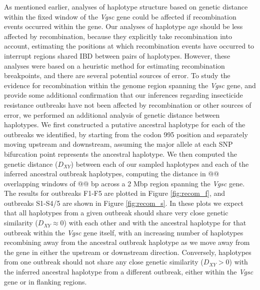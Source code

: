 \documentclass[a4paper,11pt,abstracton,hidelinks]{scrartcl}
\begin{document}
%
As mentioned earlier, analyses of haplotype structure based on genetic distance within the fixed window of the \textit{Vgsc} gene could be affected if recombination events occurred within the gene.
%
Our analyses of haplotype age should be less affected by recombination, because they explicitly take recombination into account, estimating the positions at which recombination events have occurred to interrupt regions shared IBD between pairs of haplotypes.
%
However, these analyses were based on a heuristic method for estimating recombination breakpoints, and there are several potential sources of error.
%
To study the evidence for recombination within the genome region spanning the \textit{Vgsc} gene, and provide some additional confirmation that our inferences regarding insecticide resistance outbreaks have not been affected by recombination or other sources of error, we performed an additional analysis of genetic distance between haplotypes.
%
We first constructed a putative ancestral haplotype for each of the outbreaks we identified, by starting from the codon 995 position and separately moving upstream and downstream, assuming the major allele at each SNP bifurcation point represents the ancestral haplotype.
%
We then computed the genetic distance ($D_{XY}$) between each of our sampled haplotypes and each of the inferred ancestral outbreak haplotypes, computing the distance in @@ overlapping windows of @@ bp across a 2 Mbp region spanning the \textit{Vgsc} gene.
%
The results for outbreaks F1-F5 are plotted in Figure \ref{fig:recom_f}, and outbreaks S1-S4/5 are shown in Figure \ref{fig:recom_s}.
%
In these plots we expect that all haplotypes from a given outbreak should share very close genetic similarity ($D_{XY} \approx 0$) with each other and with the ancestral haplotype for that outbreak within the \textit{Vgsc} gene itself, with an increasing number of haplotypes recombining away from the ancestral outbreak haplotype as we move away from the gene in either the upstream or downstream direction.
%
Conversely, haplotypes from one outbreak should not share any close genetic similarity ($D_{XY} > 0$) with the inferred ancestral haplotype from a different outbreak, either within the \textit{Vgsc} gene or in flanking regions.
\end{document}
